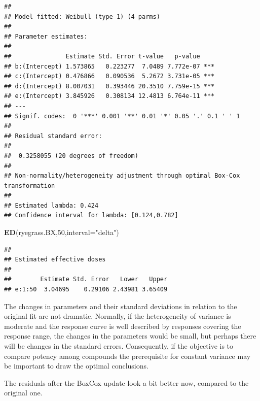 \documentclass[letterpaper,]{book}
\newenvironment{Shaded}{\begin{snugshade}}{\end{snugshade}}
\newcommand{\DataTypeTok}[1]{\textcolor[rgb]{0.13,0.29,0.53}{#1}}
\newcommand{\DecValTok}[1]{\textcolor[rgb]{0.00,0.00,0.81}{#1}}
\newcommand{\KeywordTok}[1]{\textcolor[rgb]{0.13,0.29,0.53}{\textbf{#1}}}
\newcommand{\NormalTok}[1]{#1}
\newcommand{\StringTok}[1]{\textcolor[rgb]{0.31,0.60,0.02}{#1}}
\begin{document}
\begin{verbatim}
## 
## Model fitted: Weibull (type 1) (4 parms)
## 
## Parameter estimates:
## 
##               Estimate Std. Error t-value   p-value    
## b:(Intercept) 1.573865   0.223277  7.0489 7.772e-07 ***
## c:(Intercept) 0.476866   0.090536  5.2672 3.731e-05 ***
## d:(Intercept) 8.007031   0.393446 20.3510 7.759e-15 ***
## e:(Intercept) 3.845926   0.308134 12.4813 6.764e-11 ***
## ---
## Signif. codes:  0 '***' 0.001 '**' 0.01 '*' 0.05 '.' 0.1 ' ' 1
## 
## Residual standard error:
## 
##  0.3258055 (20 degrees of freedom)
## 
## Non-normality/heterogeneity adjustment through optimal Box-Cox transformation
## 
## Estimated lambda: 0.424 
## Confidence interval for lambda: [0.124,0.782]
\end{verbatim}

\begin{Shaded}
\begin{Highlighting}[]
\KeywordTok{ED}\NormalTok{(ryegrass.BX,}\DecValTok{50}\NormalTok{,}\DataTypeTok{interval=}\StringTok{"delta"}\NormalTok{)}
\end{Highlighting}
\end{Shaded}

\begin{verbatim}
## 
## Estimated effective doses
## 
##        Estimate Std. Error   Lower   Upper
## e:1:50  3.04695    0.29106 2.43981 3.65409
\end{verbatim}

The changes in parameters and their standard deviations in relation to the original fit are not dramatic. Normally, if the heterogeneity of variance is moderate and the response curve is well described by responses covering the response range, the changes in the parameters would be small, but perhaps there will be changes in the standard errors. Consequently, if the objective is to compare potency among compounds the prerequisite for constant variance may be important to draw the optimal conclusions.

The residuals after the BoxCox update look a bit better now, compared to the original one.
\end{document}
